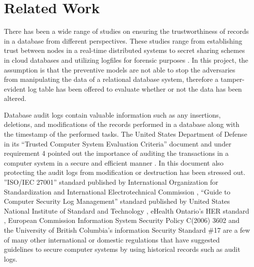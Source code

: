 \section {Related Work}
There has been a wide range of studies on ensuring the trustworthiness of records in a database from different perspectives. These studies range from establishing trust between nodes in a real-time distributed systems \cite{khayat2017trust} to secret sharing schemes in cloud databases \cite{dutta2013privacy} and utilizing logfiles for forensic purposes \cite{sinha2014continuous}. In this project, the assumption is that the preventive models are not able to stop the adversaries from manipulating the data of a relational database system, therefore a tamper-evident log table has been offered to evaluate whether or not the data has been altered. 

Database audit logs contain valuable information such as any insertions, deletions, and modifications of the records performed in a database along with the timestamp of the performed tasks. The United States Department of Defense in its “Trusted Computer System Evaluation Criteria” document and under requirement 4 pointed out the importance of auditing the transactions in a computer system in a secure and efficient manner \cite{USDoD1985}. In this document also protecting the audit logs from modification or destruction has been stressed out. ”ISO/IEC 27001” standard published by International Organization for Standardization and International Electrotechnical Commission \cite{ISOIEC27001}, “Guide to Computer Security Log Management” standard published by United States National Institute of Standard and Technology \cite{NIST2006}, eHealth Ontario's HER standard \cite{ehealth3542}, European Commission Information System Security Policy C(2006) 3602 \cite{EC2006} and the University of British Columbia's information Security Standard {\#}17 \cite{UBC2014} are a few of many other international or domestic regulations that have suggested guidelines to secure computer systems by using historical records such as audit logs.

